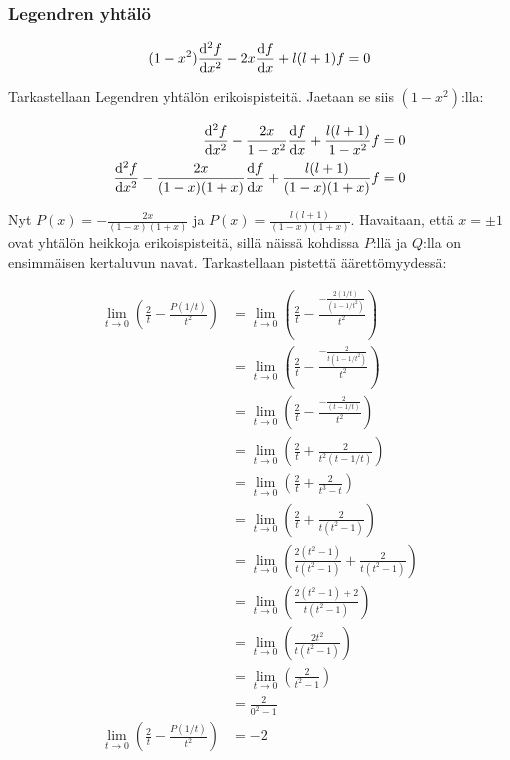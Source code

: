 \documentclass[../johdoksia.tex]{subfiles}
\begin{document}
	\subsubsection{Legendren yhtälö}
	
	\begin{equation}
		(1 - x^2)\odv{^2f}{x^2} - 2x\odv{f}{x} + l(l + 1)f = 0
	\end{equation}

	Tarkastellaan Legendren yhtälön erikoispisteitä. Jaetaan se siis $(1 - x^2)$:lla:
	
	\begin{align*}
		\odv{^2f}{x^2} - \frac{2x}{1 - x^2}\odv{f}{x} + \frac{l(l + 1)}{1 - x^2}f &= 0 \\
		\odv{^2f}{x^2} - \frac{2x}{(1 - x)(1 + x)}\odv{f}{x} + \frac{l(l + 1)}{(1 - x)(1 + x)}f &= 0 \\
	\end{align*}

	Nyt $P(x) = -\frac{2x}{(1 - x)(1 + x)}$ ja $P(x) = \frac{l(l + 1)}{(1 - x)(1 + x)}$. Havaitaan, että $x = \pm 1$ ovat yhtälön heikkoja erikoispisteitä, sillä näissä kohdissa $P$:llä ja $Q$:lla on ensimmäisen kertaluvun navat. Tarkastellaan pistettä äärettömyydessä:
	
	\begin{align*}
		\lim_{t \to 0}\left(\frac{2}{t} - \frac{P(1 / t)}{t^2}\right) &= \lim_{t\to 0}\left(\frac{2}{t} - \frac{-\frac{2(1 / t)}{(1 - 1/t^2)}}{t^2}\right) \\
		&= \lim_{t\to 0}\left(\frac{2}{t} - \frac{-\frac{2}{t(1 - 1/t^2)}}{t^2}\right) \\
		&= \lim_{t\to 0}\left(\frac{2}{t} - \frac{-\frac{2}{(t - 1/t)}}{t^2}\right) \\
		&= \lim_{t\to 0}\left(\frac{2}{t} + \frac{2}{t^2(t - 1/t)}\right) \\
		&= \lim_{t\to 0}\left(\frac{2}{t} + \frac{2}{t^3 - t}\right) \\
		&= \lim_{t\to 0}\left(\frac{2}{t} + \frac{2}{t(t^2 - 1)}\right) \\
		&= \lim_{t\to 0}\left(\frac{2(t^2 - 1)}{t(t^2 - 1)} + \frac{2}{t(t^2 - 1)}\right) \\
		&= \lim_{t\to 0}\left(\frac{2(t^2 - 1) + 2}{t(t^2 - 1)}\right) \\
		&= \lim_{t\to 0}\left(\frac{2t^2}{t(t^2 - 1)}\right) \\
		&= \lim_{t\to 0}\left(\frac{2}{t^2 - 1}\right) \\
		&= \frac{2}{0^2 - 1} \\
		\lim_{t \to 0}\left(\frac{2}{t} - \frac{P(1 / t)}{t^2}\right) &= -2
	\end{align*}
\end{document}
